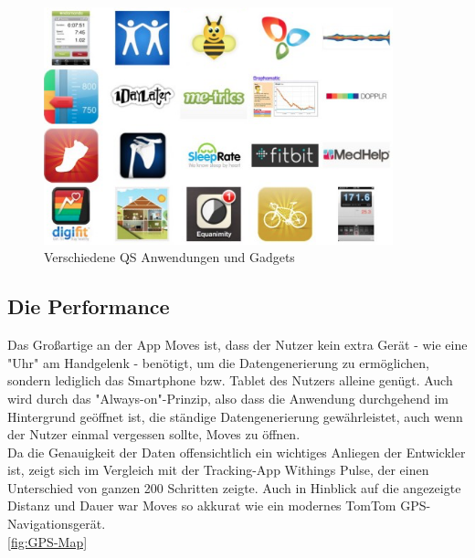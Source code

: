 \begin{figure}
\centering
\includegraphics[width=0.9\textwidth]{images/qs-anwndungen-gadgets.png}
\caption{Verschiedene QS Anwendungen und Gadgets \cite{fig:Anwendungen}}
\label{fig:Anwendungen}
\end{figure}

\subsection{Die Performance}
\label{ch:Apps:sec:Moves:subsec:PERF}

Das Großartige an der App Moves ist, dass der Nutzer kein extra Gerät - wie eine "Uhr" am Handgelenk - benötigt, um die Datengenerierung zu ermöglichen, sondern lediglich das Smartphone bzw. Tablet des Nutzers alleine genügt. 
Auch wird durch das "Always-on"-Prinzip, also dass die Anwendung durchgehend im Hintergrund geöffnet ist, die ständige Datengenerierung gewährleistet, auch wenn der Nutzer einmal vergessen sollte, Moves zu öffnen.
\\
Da die Genauigkeit der Daten offensichtlich ein wichtiges Anliegen der Entwickler ist, zeigt sich im Vergleich mit der Tracking-App Withings Pulse, der einen Unterschied von ganzen 200 Schritten zeigte. 
Auch in Hinblick auf die angezeigte Distanz und Dauer war Moves so akkurat wie ein modernes TomTom GPS-Navigationsgerät.
\\
\ref{fig:GPS-Map}

